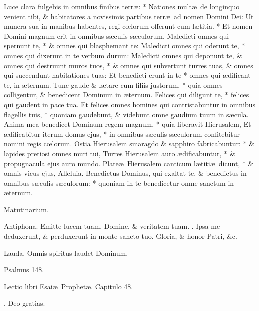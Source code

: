 \documentclass[letter,11pt]{book}
\makeatletter
\DeclareRobustCommand{\Vbar}{\vers@resp{-0.1em}{V}}
\DeclareRobustCommand{\Rbar}{\vers@resp{0pt}{R}}
\newcommand{\vers@resp@sym}{\raisebox{0.2ex}{\rotatebox[origin=c]{-20}{$\m@th\rceil$}}}
\newcommand{\vers@resp}[2]{%
  {\ooalign{\hidewidth\kern#1\vers@resp@sym\hidewidth\cr#2\cr}}%
}%
\def\V{\color{Red} \Vbar . \color{black}}
\def\R{\color{Red} \Rbar . \color{black}}
\makeatother
\begin{document}
\begin{multicols*}{2}
Luce clara fulgebis in omnibus finibus terr\ae : * Nationes mult\ae \ de longinquo venient tibi, \& habitatores a novissimis partibus terr\ae \ ad nomen Domini Dei:
Ut munera sua in manibus habentes, regi c\oe lorum offerunt cum l\ae titia. * Et nomen Domini magnum erit in omnibus s\ae culis s\ae culorum.
Maledicti omnes qui spernunt te, * \& omnes qui blasphemant te:
Maledicti omnes qui oderunt te, * omnes qui dixerunt in te verbum durum:
Maledicti omnes qui deponunt te, \& omnes qui destruunt muros tuos, * \& omnes qui subvertunt turres tuas, \& omnes qui succendunt habitationes tuas:
Et benedicti erunt in te * omnes qui \ae dificant te, in \ae ternum.
Tunc gaude \& l\ae tare cum filiis justorum, * quia omnes colligentur, \& benedicent Dominum in \ae ternum.
Felices qui diligunt te, * felices qui gaudent in pace tua.
Et felices omnes homines qui contristabuntur in omnibus flagellis tuis, * quoniam gaudebunt, \& videbunt omne gaudium tuum in s\ae cula.
Anima mea benedicet Dominum regem magnum, * quia liberavit Hierusalem,
Et \ae dificabitur iterum domus ejus, * in omnibus s\ae culis s\ae culorum confitebitur nomini regis c\oe lorum.
Ostia Hierusalem smaragdo \& sapphiro fabricabuntur: * \& lapides pretiosi omnes muri tui,
Turres Hierusalem auro \ae dificabuntur, * \& propugnacula ejus auro mundo.
Plate\ae \ Hierusalem canticum l\ae titi\ae \ dicunt, * \& omnis vicus ejus, Alleluia.
Benedictus Dominus, qui exaltat te, \& benedictus in omnibus s\ae culis s\ae culorum: * quoniam in te benedicetur omne sanctum in \ae ternum.

Matutinarium.

Antiphona. Emitte lucem tuam, Domine, \& veritatem tuam. \V Ipsa me deduxerunt, \& perduxerunt in monte sancto tuo. Gloria, \& honor Patri, \&c.

Lauda. Omnis spiritus laudet Dominum.

Psalmus 148.

Lectio libri Esai\ae \ Prophet\ae . Capitulo 48.

\R Deo gratias.


\end{multicols*}
\end{document}
